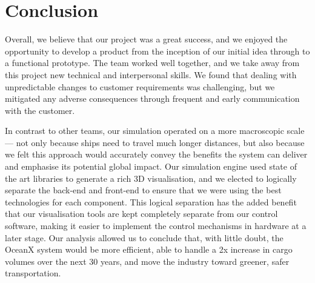 \newpage
\section{Conclusion}
Overall, we believe that our project was a great success, and we enjoyed the opportunity to develop a product from the inception of our initial idea through to a functional prototype. The team worked well together, and we take away from this project new technical and interpersonal skills. We found that dealing with unpredictable changes to customer requirements was challenging, but we mitigated any adverse consequences through frequent and early communication with the customer. 

In contrast to other teams, our simulation operated on a more macroscopic scale — not only because ships need to travel much longer distances, but also because we felt this approach would accurately convey the benefits the system can deliver and emphasise its potential global impact. Our simulation engine used state of the art libraries to generate a rich 3D visualisation, and we elected to logically separate the back-end and front-end to ensure that we were using the best technologies for each component. This logical separation has the added benefit that our visualisation tools are kept completely separate from our control software, making it easier to implement the control mechanisms in hardware at a later stage. Our analysis allowed us to conclude that, with little doubt, the OceanX system would be more efficient, able to handle a 2x increase in cargo volumes over the next 30 years, and move the industry toward greener, safer transportation.